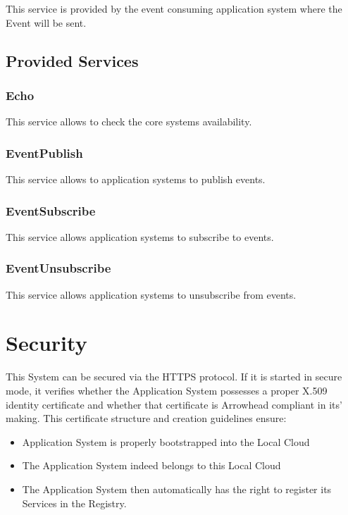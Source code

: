 \documentclass[a4paper]{arrowhead}
\newcommand{\spdef}[2]{{\textcolor{ArrowheadBlue}{#2\label{sec:services:produced:#1}}}}
\begin{document}
This service is provided by the event consuming application system where the Event will be sent.


\subsection{Provided Services}

\subsubsection{\spdef{Echo}{Echo}}

This service allows to check the core systems availability.

\subsubsection{\spdef{EventPublish}{EventPublish}}

This service allows to application systems to publish events.

\subsubsection{\spdef{EventSubscribe}{EventSubscribe}}

This service allows application systems to subscribe to events.

\subsubsection{\spdef{EventUnsubscribe}{EventUnsubscribe}}

This service allows application systems to unsubscribe from events.

\section{Security}
\label{sec:security}

This System can be secured via the HTTPS protocol. If it is started in secure mode, it verifies whether the Application System possesses a proper X.509 identity certificate and whether that certificate is Arrowhead compliant in its' making. This certificate structure and creation guidelines ensure:

\begin{itemize}
    \item Application System is properly bootstrapped into the Local Cloud
    \item The Application System indeed belongs to this Local Cloud
    \item The Application System then automatically has the right to register its Services in the Registry.
   
\end{itemize}
\end{document}
